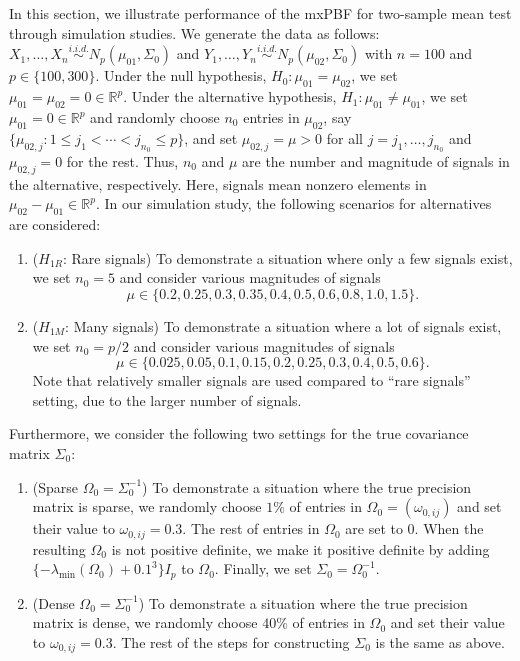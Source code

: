 \documentclass[11pt]{article}
\newcommand{\sg}{\Sigma}
\newcommand{\bbR}{\mathbb{R}}
\begin{document}
In this section, we illustrate performance of the mxPBF for two-sample mean test through simulation studies. 
We generate the data as follows: $X_1,\ldots, X_{n} \overset{i.i.d.}{\sim} N_p( \mu_{01} , \sg_0)$ and $Y_1,\ldots, Y_{n} \overset{i.i.d.}{\sim} N_p( \mu_{02} , \sg_0)$ with $n = 100$ and $p \in \{100, 300\}$.
Under the null hypothesis, $H_0: \mu_{01} = \mu_{02}$, we set $\mu_{01} = \mu_{02} = 0 \in \bbR^p$.
Under the alternative hypothesis, $H_1: \mu_{01} \neq \mu_{01}$, we set $\mu_{01}=0 \in \bbR^p$ and randomly choose $n_0$ entries in $\mu_{02}$, say $\{ \mu_{02,j} : 1\le  j_1 < \cdots <  j_{n_0} \le p \}$, and set $\mu_{02, j} = \mu>0$ for all $j = j_1,\ldots, j_{n_0}$ and $\mu_{02,j}=0$ for the rest.
Thus, $n_0$ and $\mu$ are the number and magnitude of signals in the alternative, respectively.
Here, signals mean nonzero elements in $\mu_{02}- \mu_{01} \in \bbR^p$.
In our simulation study, the following scenarios for alternatives are considered:
\begin{enumerate}
	\item ($H_{1R}$: Rare signals) 
	To demonstrate a situation where only a few signals exist, we set $n_0 = 5$ and consider various magnitudes of signals \begin{equation*}
		\mu \in \{ 0.2, 0.25, 0.3, 0.35, 0.4, 0.5, 0.6, 0.8, 1.0, 1.5 \}.	
	\end{equation*}
	
	\item ($H_{1M}$: Many signals) 
	To demonstrate a situation where a lot of signals exist, 
	we set $n_0 = p/2$ and consider various magnitudes of signals \begin{equation*}
		\mu \in \{ 0.025, 0.05, 0.1, 0.15, 0.2, 0.25, 0.3, 0.4, 0.5, 0.6 \}.
	\end{equation*} 
	Note that relatively smaller signals are used compared to ``rare signals'' setting, due to the larger number of signals.
\end{enumerate}
Furthermore, we consider the following two settings for the true covariance matrix $\sg_0$: 
\begin{enumerate}
	\item (Sparse $\Omega_0 = \sg_0^{-1}$) 
	To demonstrate a situation where the true precision matrix is sparse, we randomly choose $1\%$ of entries in $\Omega_0 = (\omega_{0, ij})$ and set their value to $\omega_{0, ij} = 0.3$.
	The rest of entries in $\Omega_0$ are set to $0$. 
	When the resulting $\Omega_0$ is not positive definite, we make it positive definite by adding $\{-\lambda_{\min}(\Omega_0) + 0.1^3\} I_p$ to $\Omega_0$.
	Finally, we set $\sg_0 = \Omega_0^{-1}$.
	
	\item (Dense $\Omega_0 = \sg_0^{-1}$) 
	To demonstrate a situation where the true precision matrix is dense, we randomly choose $40\%$ of entries in $\Omega_0$ and set their value to $\omega_{0, ij} = 0.3$.
	The rest of the steps for constructing $\sg_0$ is the same as above.
\end{enumerate}
\end{document}
